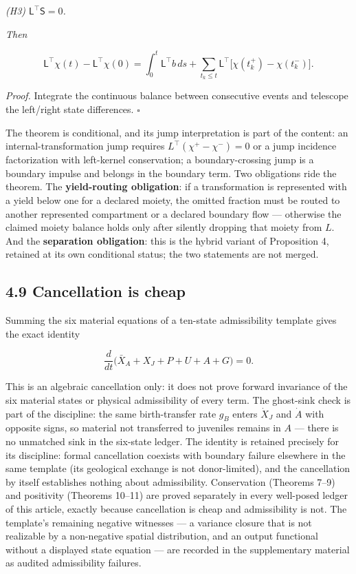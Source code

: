 \documentclass[11pt]{article}
\begin{document}
\emph{(H3) \(\mathsf{L}^\top \mathsf{S} =\allowbreak{} 0\).}

\emph{Then} 

$$\mathsf{L}^\top \chi(t) - \mathsf{L}^\top \chi(0) = \int_0^t \mathsf{L}^\top b\, ds + \sum_{t_k \le t} \mathsf{L}^\top \bigl[ \chi(t_k^+) - \chi(t_k^-) \bigr].$$



\emph{Proof.} Integrate the continuous balance between consecutive events and telescope the left/\allowbreak{}right state differences. \(\square\)

The theorem is conditional, and its jump interpretation is part of the content: an internal-transformation jump requires \(L^{\top}(\chi^+-\chi^-)=0\) or a jump incidence factorization with left-kernel conservation; a boundary-crossing jump is a boundary impulse and belongs in the boundary term. Two obligations ride the theorem. The \textbf{yield-routing obligation}: if a transformation is represented with a yield below one for a declared moiety, the omitted fraction must be routed to another represented compartment or a declared boundary flow --- otherwise the claimed moiety balance holds only after silently dropping that moiety from \(L\). And the \textbf{separation obligation}: this is the hybrid variant of Proposition 4, retained at its own conditional status; the two statements are not merged.

\subsection*{4.9 Cancellation is cheap}\label{49-cancellation-is-cheap}

Summing the six material equations of a ten-state admissibility template gives the exact identity 

$$\frac{d}{dt}\bigl( \bar X_A + X_J + P + U + A + G \bigr) = 0.$$

 This is an algebraic cancellation only: it does not prove forward invariance of the six material states or physical admissibility of every term. The ghost-sink check is part of the discipline: the same birth-transfer rate \(g_B\) enters \(\dot X_J\) and \(\dot A\) with opposite signs, so material not transferred to juveniles remains in \(A\) --- there is no unmatched sink in the six-state ledger. The identity is retained precisely for its discipline: formal cancellation coexists with boundary failure elsewhere in the same template (its geological exchange is not donor-limited), and the cancellation by itself establishes nothing about admissibility. Conservation (Theorems 7--9) and positivity (Theorems 10--11) are proved separately in every well-posed ledger of this article, exactly because cancellation is cheap and admissibility is not. The template's remaining negative witnesses --- a variance closure that is not realizable by a non-negative spatial distribution, and an output functional without a displayed state equation --- are recorded in the supplementary material as audited admissibility failures.
\end{document}
